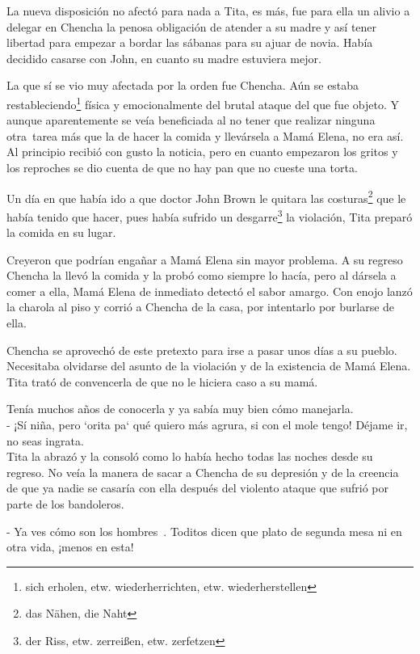 La nueva disposición no afectó para nada a Tita, es más, fue para ella
un alivio a delegar en Chencha la penosa obligación de atender a su
madre y así tener libertad para empezar a bordar las sábanas para su
ajuar de novia. Había decidido casarse con John, en cuanto su madre
estuviera mejor.

La que sí se vio muy afectada por la orden fue Chencha. Aún se estaba restableciendo\footnote{sich erholen,  etw. wiederherrichten, etw. wiederherstellen}
física y emocionalmente del brutal ataque del que fue
objeto. Y aunque aparentemente se veía beneficiada al no tener que
realizar ninguna otra~tarea más que la de hacer la comida y
llevársela a Mamá Elena, no era así. Al principio recibió con gusto la
noticia, pero en cuanto empezaron los gritos y los reproches se dio
cuenta de que no hay pan que no cueste una torta.

Un día en que había ido a que doctor John Brown le quitara las costuras\footnote{das Nähen, die Naht} que le
había tenido que hacer, pues había sufrido un desgarre\footnote{der Riss, etw. zerreißen, etw. zerfetzen}
la violación, Tita preparó la comida en su lugar.

Creyeron que podrían engañar a Mamá Elena sin mayor problema. A su
regreso Chencha la llevó la comida y la probó como siempre lo hacía,
pero al dársela a comer a ella, Mamá Elena de inmediato detectó el sabor
amargo. Con enojo lanzó la charola al piso y corrió a Chencha de la
casa, por intentarlo por burlarse de ella.

Chencha se aprovechó de este pretexto para irse a pasar unos días a su
pueblo. Necesitaba olvidarse del asunto de la violación y de la
existencia de Mamá Elena. Tita trató de convencerla de que no le hiciera
caso a su mamá.

Tenía muchos años de conocerla y ya sabía muy bien cómo manejarla.
\\- ¡Sí niña, pero ‘orita pa‘ qué quiero más agrura, si con el mole %
tengo! Déjame ir, no seas ingrata.\\

Tita la abrazó y la consoló como lo había hecho todas las noches desde
su regreso. No veía la manera de sacar a Chencha de su depresión y de la
creencia de que ya nadie se casaría con ella después del violento ataque
que sufrió por parte de los bandoleros.

- Ya ves cómo son los hombres~. Toditos dicen que plato de segunda %
mesa ni en otra vida, ¡menos en esta!\\

